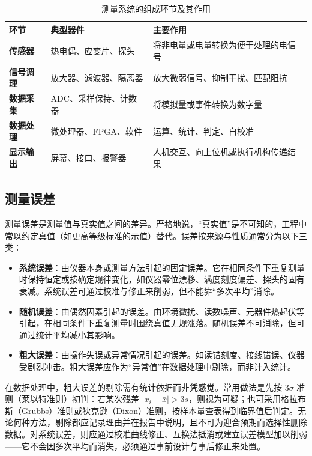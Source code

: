 \begin{table}[htbp]
    \centering
    \caption{测量系统的组成环节及其作用}
    \begin{tabular}{|p{3.0cm}|p{4.8cm}|p{6.4cm}|}
        \hline
        \textbf{环节} & \textbf{典型器件} & \textbf{主要作用} \\
        \hline
        \textbf{传感器} & 热电偶、应变片、探头 & 将非电量或电量转换为便于处理的电信号 \\
        \hline
        \textbf{信号调理} & 放大器、滤波器、隔离器 & 放大微弱信号、抑制干扰、匹配阻抗 \\
        \hline
        \textbf{数据采集} & ADC、采样保持、计数器 & 将模拟量或事件转换为数字量 \\
        \hline
        \textbf{数据处理} & 微处理器、FPGA、软件 & 运算、统计、判定、自校准 \\
        \hline
        \textbf{显示输出} & 屏幕、接口、报警器 & 人机交互、向上位机或执行机构传递结果 \\
        \hline
    \end{tabular}
\end{table}

\subsection{测量误差}

测量误差是测量值与真实值之间的差异。严格地说，“真实值”是不可知的，工程中常以约定真值（如更高等级标准的示值）替代。误差按来源与性质通常分为以下三类：

\begin{itemize}
    \item \textbf{系统误差}：由仪器本身或测量方法引起的固定误差。它在相同条件下重复测量时保持恒定或按确定规律变化，如仪器零位漂移、满度刻度偏差、探头的固有衰减。系统误差可通过校准与修正来削弱，但不能靠“多次平均”消除。
    \item \textbf{随机误差}：由偶然因素引起的误差。由环境微扰、读数噪声、元器件热起伏等引起，在相同条件下重复测量时围绕真值无规涨落。随机误差不可消除，但可通过统计平均减小其影响。
    \item \textbf{粗大误差}：由操作失误或异常情况引起的误差。如读错刻度、接线错误、仪器受剧烈冲击。粗大误差应作为“异常值”在数据处理中剔除，而非计入统计。
\end{itemize}

在数据处理中，粗大误差的剔除需有统计依据而非凭感觉。常用做法是先按 $3\sigma$ 准则（莱以特准则）初判：若某次残差 $|x_i-\bar{x}| > 3s$，则视为可疑；也可采用格拉布斯（Grubbs）准则或狄克逊（Dixon）准则，按样本量查表得到临界值后判定。无论何种方法，剔除都应记录理由并在报告中说明，且不可为迎合预期而选择性删除数据。对系统误差，则应通过校准曲线修正、互换法抵消或建立误差模型加以削弱——它不会因多次平均而消失，必须通过事前设计与事后修正来处置。

